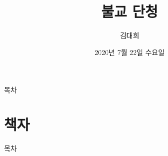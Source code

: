 \documentclass[aspectratio=1610,10pt,xcolor=pdftex,dvipsnames,table,handout]{beamer}
\begin{document}
	

			\title{ 불교 단청  }
			\author{ 김대희 }
			\date{ 2020년 7월 22일 수요일 }


%
%
%
%


		\begin{frame}[plain]
		\titlepage
		\end{frame}


		\begin{frame} [plain]{목차}
		\tableofcontents%
		\end{frame}



		\part{ 책자 }
		\frame{\partpage}

		\begin{frame} [plain]{목차}
		\tableofcontents%
		\end{frame}
		

\end{document}
